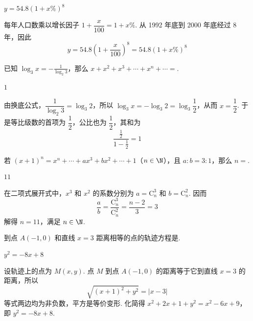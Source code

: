 \begin{answer}
\(y=54.8\left(1+x\%\right)^8\)
\end{answer}

\begin{solution}
每年人口数乘以增长因子 \(1+\dfrac{x}{100}=1+x\%\). 从 1992 年底到 2000 年底经过 \(8\) 年，因此
\[
y=54.8\left(1+\frac{x}{100}\right)^8=54.8\left(1+x\%\right)^8
\]
\end{solution}

\begin{problem}
已知 \(\log_3 x=-\frac{1}{\log_2 3}\)，那么 \(x+x^2+x^3+\cdots+x^n+\cdots=\)\fillinblank{}.
\end{problem}

\begin{answer}
\(1\)
\end{answer}

\begin{solution}
由换底公式，\(\dfrac{1}{\log_2 3}=\log_3 2\)，所以 \(\log_3x=-\log_3 2=\log_3\dfrac12\)，从而 \(x=\dfrac12\). 于是等比级数的首项为 \(\dfrac12\)，公比也为 \(\dfrac12\)，其和为
\[
\frac{\frac12}{1-\frac12}=1
\]
\end{solution}

\begin{problem}
若 \((x+1)^n=x^n+\cdots+ax^3+bx^2+\cdots+1\)（\(n\in\N\)），且 \(a:b=3:1\)，那么 \(n=\)\fillinblank{}.
\end{problem}

\begin{answer}
\(11\)
\end{answer}

\begin{solution}
在二项式展开式中，\(x^3\) 和 \(x^2\) 的系数分别为 \(a=\mathrm C_n^3\) 和 \(b=\mathrm C_n^2\). 因而
\[
\frac{a}{b}=\frac{\mathrm C_n^3}{\mathrm C_n^2}=\frac{n-2}{3}=3
\]
解得 \(n=11\)，满足 \(n\in\N\).
\end{solution}

\begin{problem}
到点 \(A(-1,0)\) 和直线 \(x = 3\) 距离相等的点的轨迹方程是\fillinblank{}.
\end{problem}

\begin{answer}
\(y^2=-8x+8\)
\end{answer}

\begin{solution}
设轨迹上的点为 \(M(x,y)\). 点 \(M\) 到点 \(A(-1,0)\) 的距离等于它到直线 \(x=3\) 的距离，所以
\[
\sqrt{(x+1)^2+y^2}=|x-3|
\]
等式两边均为非负数，平方是等价变形. 化简得 \(x^2+2x+1+y^2=x^2-6x+9\)，即 \(y^2=-8x+8\).
\end{solution}

